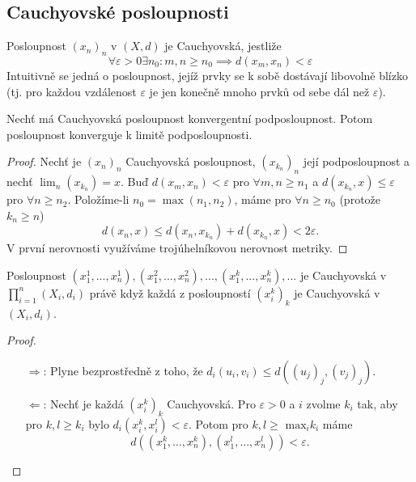 \documentclass[../main.tex]{subfiles}
\begin{document}
\subsection{Cauchyovské posloupnosti}

\begin{definition}
	Posloupnost $(x_n)_n$ v $(X,d)$ je Cauchyovská, jestliže
	\[ \forall \varepsilon > 0 \exists n_0: m,n \geq n_0 \implies d(x_m, x_n) < \varepsilon \]
	Intuitivně se jedná o posloupnost, jejíž prvky se k sobě dostávají libovolně blízko (tj. pro každou vzdálenost $\varepsilon$ je jen konečně mnoho prvků od sebe dál než $\varepsilon$).
\end{definition}

\begin{lemma}
	Nechť má Cauchyovská posloupnost konvergentní podposloupnost. Potom posloupnost konverguje k limitě
	podposloupnosti.
\end{lemma}

\begin{proof}
	Nechť je $(x_n)_n$ Cauchyovská posloupnost, $(x_{k_n})_n$ její podposloupnost a nechť $\lim_{n}(x_{k_n}) = x.$ Buď $d(x_m,x_n) < \varepsilon$ pro $ \forall m,n \geq n_1$ 
	a $d(x_{k_n},x) \leq \varepsilon$ pro $\forall n \geq n_2$. Položíme-li $n_0 = \max(n_1,n_2)$, máme pro $\forall n \geq n_0$ (protože $k_n \geq n$)
	\[d(x_n,x) \leq d(x_n,x_{k_n}) + d(x_{k_n},x) < 2\varepsilon.\]
	V první nerovnosti využíváme trojúhelníkovou nerovnost metriky.
\end{proof}

\begin{lemma}
	Posloupnost $(x_{1}^{1}, ... , x_{n}^{1}), (x_{1}^{2},...,x_{n}^{2}), ...,(x_{1}^{k},...,x_{n}^{k}),...$
	je Cauchyovská v $\prod_{i=1}^{n}(X_i, d_i)$ právě když každá z posloupností $(x_{i}^{k})_k$ je
	Cauchyovská v $(X_i, d_i)$.
\end{lemma}

\begin{proof}
	\begin{itemize}
	    \item[ $\Rightarrow$:] Plyne bezprostředně z toho, že $d_i(u_i,v_i) \leq d((u_j)_j,(v_j)_j).$
	    \item[ $\Leftarrow$:] Nechť je každá $(x_i^k)_k$ Cauchyovská. Pro $\varepsilon > 0$ a $i$ zvolme $k_i$ tak,
	    aby pro $k,l \geq k_i$ bylo $d_i(x_i^k, x_i^l) < \varepsilon.$ Potom pro $k,l \geq$ $\text{max}_i k_i$ máme 
	    \[d((x_1^k,...,x_n^k),(x_1^l,...,x_n^l)) < \varepsilon.\]
	\end{itemize}
\end{proof}
\end{document}

